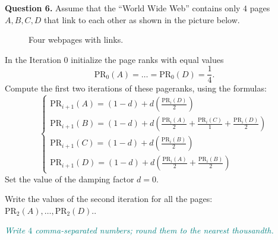 \documentclass[jou]{apa6}
\begin{document}
\vspace{10pt}
{\bf Question 6.} Assume that the ``World Wide Web'' contains only 
$4$ pages $A,B,C,D$ that link to each other as shown in the picture below.


\begin{figure}[!htb]
\caption{\label{fig:pageranks} Four webpages with links.}
\end{figure}



In the Iteration $0$ initialize the page ranks with equal values 
$$\text{PR}_0(A) = \ldots = \text{PR}_0(D) = \frac{1}{4}.$$ 
Compute the first two iterations of these pageranks, using the formulas: 
$$\left\{ \begin{array}{l}
\text{PR}_{i+1}(A) = (1 - d) + d\left( \frac{\text{PR}_i(D)}{2} \right)\\
\text{PR}_{i+1}(B) = (1 - d) + d\left( \frac{\text{PR}_i(A)}{2} + \frac{\text{PR}_i(C)}{1} + \frac{\text{PR}_i(D)}{2}  \right)\\
\text{PR}_{i+1}(C) = (1 - d) + d\left( \frac{\text{PR}_i(B)}{2} \right)\\
\text{PR}_{i+1}(D) = (1 - d) + d\left( \frac{\text{PR}_i(A)}{2} + \frac{\text{PR}_i(B)}{2} \right)
\end{array} \right.$$
Set the value of the damping factor $d=0$.

Write the values of the second iteration for all the pages:
$\text{PR}_2(A),\ldots,\text{PR}_2(D).$.

\textcolor{teal}{\em Write $4$ comma-separated numbers; round them to 
the nearest thousandth.}
\end{document}
